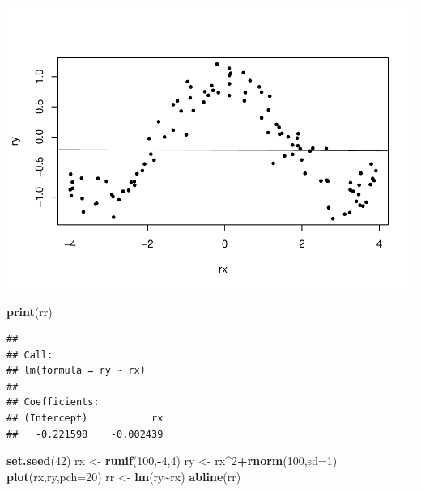 \documentclass[
]{book}
\newenvironment{Shaded}{\begin{snugshade}}{\end{snugshade}}
\newcommand{\AttributeTok}[1]{\textcolor[rgb]{0.13,0.29,0.53}{#1}}
\newcommand{\DecValTok}[1]{\textcolor[rgb]{0.00,0.00,0.81}{#1}}
\newcommand{\FunctionTok}[1]{\textcolor[rgb]{0.13,0.29,0.53}{\textbf{#1}}}
\newcommand{\NormalTok}[1]{#1}
\newcommand{\OtherTok}[1]{\textcolor[rgb]{0.56,0.35,0.01}{#1}}
\newcommand{\SpecialCharTok}[1]{\textcolor[rgb]{0.81,0.36,0.00}{\textbf{#1}}}
\begin{document}
\includegraphics{_main_files/figure-latex/unnamed-chunk-20-1.pdf}

\begin{Shaded}
\begin{Highlighting}[]
\FunctionTok{print}\NormalTok{(rr)}
\end{Highlighting}
\end{Shaded}

\begin{verbatim}
## 
## Call:
## lm(formula = ry ~ rx)
## 
## Coefficients:
## (Intercept)           rx  
##   -0.221598    -0.002439
\end{verbatim}

\begin{Shaded}
\begin{Highlighting}[]
\FunctionTok{set.seed}\NormalTok{(}\DecValTok{42}\NormalTok{)}
\NormalTok{rx }\OtherTok{\textless{}{-}} \FunctionTok{runif}\NormalTok{(}\DecValTok{100}\NormalTok{,}\SpecialCharTok{{-}}\DecValTok{4}\NormalTok{,}\DecValTok{4}\NormalTok{)}
\NormalTok{ry }\OtherTok{\textless{}{-}}\NormalTok{ rx}\SpecialCharTok{\^{}}\DecValTok{2}\SpecialCharTok{+}\FunctionTok{rnorm}\NormalTok{(}\DecValTok{100}\NormalTok{,}\AttributeTok{sd=}\DecValTok{1}\NormalTok{)}
\FunctionTok{plot}\NormalTok{(rx,ry,}\AttributeTok{pch=}\DecValTok{20}\NormalTok{)}
\NormalTok{rr }\OtherTok{\textless{}{-}} \FunctionTok{lm}\NormalTok{(ry}\SpecialCharTok{\textasciitilde{}}\NormalTok{rx)}
\FunctionTok{abline}\NormalTok{(rr)}
\end{Highlighting}
\end{Shaded}
\end{document}
